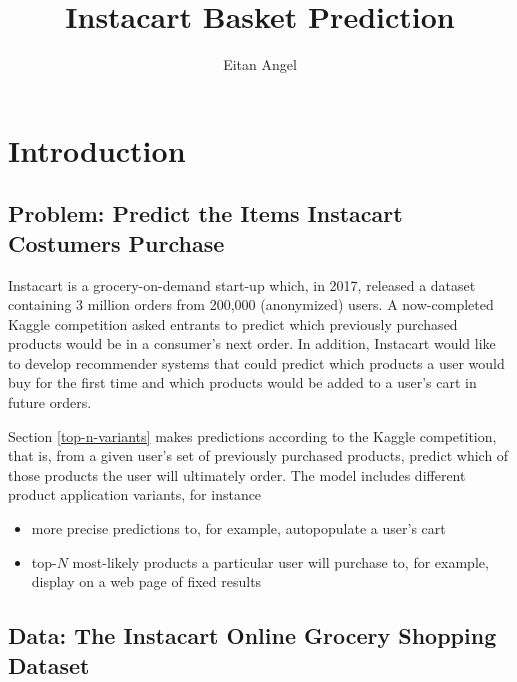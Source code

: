 \documentclass[11pt]{article}
\title{Instacart Basket Prediction}
\author{Eitan Angel}
\theoremstyle{definition}
\numberwithin{equation}{section}
\begin{document}
\maketitle

\tableofcontents

\listoffigures 

\listoftables


\newpage


\hypertarget{introduction}{%
  \section{Introduction}\label{introduction}}

\hypertarget{problem-predict-the-items-instacart-costumers-purchase}{%
  \subsection{Problem: Predict the Items Instacart Costumers Purchase}
  \label{problem-predict-the-items-instacart-costumers-purchase}}

Instacart is a grocery-on-demand start-up which, in 2017, released a
dataset containing 3 million orders from 200,000 (anonymized) users. A
now-completed Kaggle competition asked entrants to predict which
previously purchased products would be in a consumer's next order. In
addition, Instacart would like to develop recommender systems that could
predict which products a user would buy for the first time and which
products would be added to a user's cart in future orders.

Section \ref{top-n-variants} makes predictions according to the Kaggle
competition, that is, from a given user's set of previously purchased
products, predict which of those products the user will ultimately
order. The model includes different product application variants, for instance

\begin{itemize}
  \item more precise predictions to, for example, autopopulate a user's cart
  \item top-$N$ most-likely products a particular user will purchase to, for example, display on a web page of fixed results
\end{itemize}

\hypertarget{data-the-instacart-online-grocery-shopping-dataset}{%
  \subsection{Data: The Instacart Online Grocery Shopping
    Dataset}\label{data-the-instacart-online-grocery-shopping-dataset}}
\end{document}
